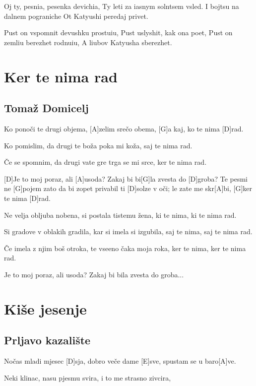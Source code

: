 \documentclass[a4paper,12pt]{article}
\begin{document}
\begin{multicols}{2}
\begin{guitar}
Oj ty, pesnia, pesenka devichia,
Ty leti za iasnym solntsem vsled.
I bojtsu na dalnem pograniche
Ot Katyushi peredaj privet.


Pust on vspomnit devushku prostuiu,
Pust uslyshit, kak ona poet,
Pust on zemliu berezhet rodnuiu,
A liubov Katyusha sberezhet.

\end{guitar}
\section{Ker te nima rad}
\subsection*{Tomaž Domicelj}
\begin{guitar}
[D]Ko ponoči te drugi objema,
[A]zelim srečo obema,
[G]a kaj, ko te nima [D]rad.


Ko pomislim, da drugi te boža
poka mi koža,
saj te nima rad.


Če se spomnim, da drugi vate gre
trga se mi srce,
ker te nima rad.


[D]Je to moj poraz, ali [A]usoda?
Zakaj bi bi[G]la zvesta do [D]groba?
Te pesmi ne [G]pojem zato
da bi zopet privabil ti [D]solze v oči;
le zate me skr[A]bi, [G]ker te nima [D]rad.


Ne velja obljuba nobena,
si postala tistemu žena,
ki te nima, ki te nima rad.


Si gradove v oblakih gradila,
kar si imela si izgubila,
saj te nima, saj te nima rad.


Če imela z njim boš otroka,
te vseeno čaka moja roka,
ker te nima, ker te nima rad.


Je to moj poraz, ali usoda?
Zakaj bi bila zvesta do groba...

\end{guitar}
\section{Kiše jesenje}
\subsection*{Prljavo kazalište}
\begin{guitar}
[A]Nočas mladi mjesec [D]sja,
dobro veče dame [E]sve,
spustam se u baro[A]ve. 
 


Neki klinac,  
nasu pjesmu svira,  
i to me strasno zivcira, 




\end{guitar}
\end{multicols}
\end{document}
